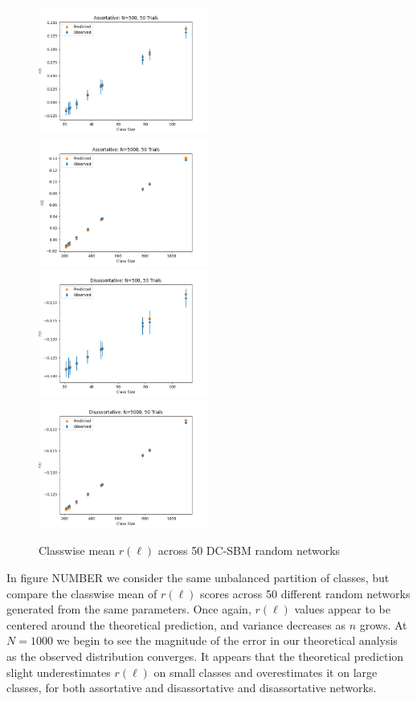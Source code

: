\documentclass[12pt]{article}
\begin{document}
\begin{figure}[h!]
\includegraphics[width=0.5\textwidth]{assortative_N_500_trials_50.png}
\includegraphics[width=0.5\textwidth]{assortative_N_5000_trials_50.png}
\includegraphics[width=0.5\textwidth]{disassortative_N_500_trials_50.png}
\includegraphics[width=0.5\textwidth]{disassortative_N_5000_trials_50.png}
\caption{Classwise mean $r(\ell)$ across 50 DC-SBM random networks}
\end{figure}

In figure NUMBER we consider the same unbalanced partition of classes, but compare the classwise mean of $r(\ell)$ scores across 50 different random networks generated from the same parameters.  Once again, $r(\ell)$ values appear to be centered around the theoretical prediction, and variance decreases as $n$ grows.  At $N=1000$ we begin to see the magnitude of the error in our theoretical analysis as the observed distribution converges.  It appears that the theoretical prediction slight underestimates $r(\ell)$ on small classes and overestimates it on large classes, for both assortative and disassortative and disassortative networks.
\end{document}

